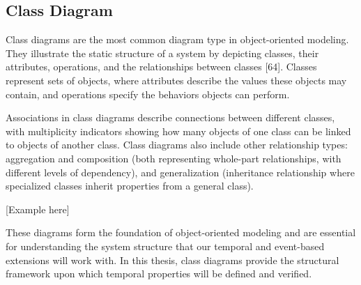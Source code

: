 \subsection{Class Diagram}
Class diagrams are the most common diagram type in object-oriented modeling. 
They illustrate the static structure of a system by depicting classes, their 
attributes, operations, and the relationships between classes [64]. Classes 
represent sets of objects, where attributes describe the values these objects 
may contain, and operations specify the behaviors objects can perform.

Associations in class diagrams describe connections between different classes, 
with multiplicity indicators showing how many objects of one class can be linked 
to objects of another class. Class diagrams also include other relationship types: 
aggregation and composition (both representing whole-part relationships, with 
different levels of dependency), and generalization (inheritance relationship 
where specialized classes inherit properties from a general class).

[Example here]

These diagrams form the foundation of object-oriented modeling and are essential 
for understanding the system structure that our temporal and event-based extensions 
will work with. In this thesis, class diagrams provide the structural framework 
upon which temporal properties will be defined and verified.



